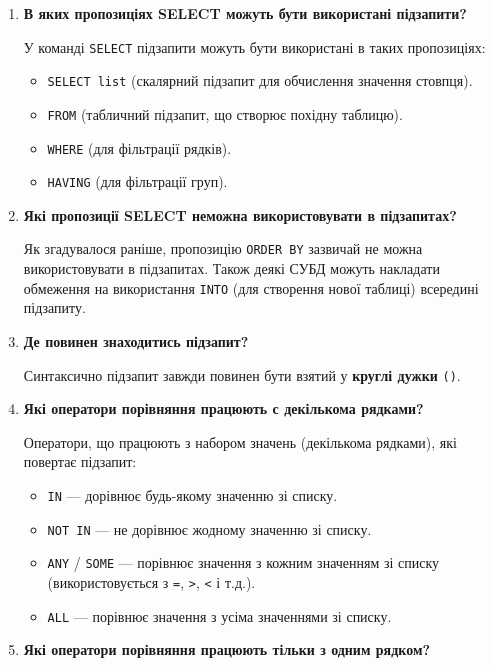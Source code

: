 \documentclass{article}
\begin{document}
\begin{enumerate}[label=\arabic*., leftmargin=*]
        \item \textbf{В яких пропозиціях SELECT можуть бути використані підзапити?}
        
        У команді \texttt{SELECT} підзапити можуть бути використані в таких пропозиціях:
        \begin{itemize}
            \item \texttt{SELECT list} (скалярний підзапит для обчислення значення стовпця).
            \item \texttt{FROM} (табличний підзапит, що створює похідну таблицю).
            \item \texttt{WHERE} (для фільтрації рядків).
            \item \texttt{HAVING} (для фільтрації груп).
        \end{itemize}

        \item \textbf{Які пропозиції SELECT неможна використовувати в підзапитах?}
        
        Як згадувалося раніше, пропозицію \texttt{ORDER BY} зазвичай не можна використовувати в підзапитах. Також деякі СУБД можуть накладати обмеження на використання \texttt{INTO} (для створення нової таблиці) всередині підзапиту.

        \item \textbf{Де повинен знаходитись підзапит?}
        
        Синтаксично підзапит завжди повинен бути взятий у \textbf{круглі дужки} \texttt{()}.

        \item \textbf{Які оператори порівняння працюють с декількома рядками?}
        
        Оператори, що працюють з набором значень (декількома рядками), які повертає підзапит:
        \begin{itemize}
            \item \texttt{IN} — дорівнює будь-якому значенню зі списку.
            \item \texttt{NOT IN} — не дорівнює жодному значенню зі списку.
            \item \texttt{ANY} / \texttt{SOME} — порівнює значення з кожним значенням зі списку (використовується з \texttt{=}, \texttt{>}, \texttt{<} і т.д.).
            \item \texttt{ALL} — порівнює значення з усіма значеннями зі списку.
        \end{itemize}

        \item \textbf{Які оператори порівняння працюють тільки з одним рядком?}
        

\end{enumerate}
\end{document}
